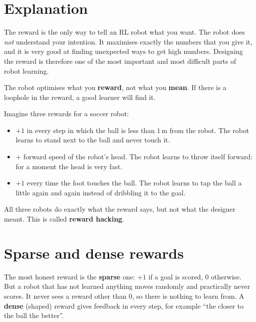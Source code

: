 \label{ch:rl5}

\section*{Explanation}
The reward is the only way to tell an RL robot what you want. The robot does \emph{not} understand your intention. It maximises exactly the numbers that you give it, and it is very good at finding unexpected ways to get high numbers. Designing the reward is therefore one of the most important and most difficult parts of robot learning.

\begin{keyidea}
The robot optimises what you \textbf{reward}, not what you \textbf{mean}. If there is a loophole in the reward, a good learner will find it.
\end{keyidea}

\begin{example}[Loopholes]
Imagine three rewards for a soccer robot:
\begin{itemize}[nosep]
  \item $+1$ in every step in which the ball is less than $1$\,m from the robot. The robot learns to stand next to the ball and never touch it.
  \item $+$ forward speed of the robot's head. The robot learns to throw itself forward: for a moment the head is very fast.
  \item $+1$ every time the foot touches the ball. The robot learns to tap the ball a little again and again instead of dribbling it to the goal.
\end{itemize}
All three robots do exactly what the reward says, but not what the designer meant. This is called \textbf{reward hacking}.
\end{example}

\section*{Sparse and dense rewards}
The most honest reward is the \textbf{sparse} one: $+1$ if a goal is scored, $0$ otherwise. But a robot that has not learned anything moves randomly and practically never scores. It never sees a reward other than $0$, so there is nothing to learn from. A \textbf{dense} (shaped) reward gives feedback in every step, for example ``the closer to the ball the better''.


